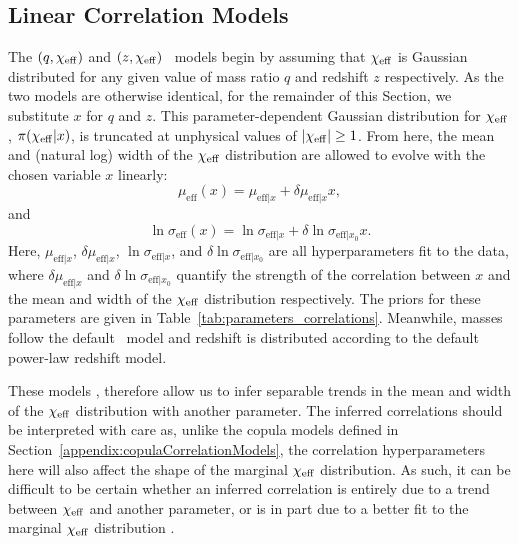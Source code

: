 \subsection{Linear Correlation Models}\label{appendix:LinearCorrelationModels}
The $(q,\chi_{\rm eff})$ and $(z,\chi_{\rm eff})$ \linearcorrelation~models begin by assuming that $\chi_{\rm eff}$ is Gaussian distributed for any given value of mass ratio $q$ and redshift $z$ respectively.
As the two models are otherwise identical, for the remainder of this Section, we substitute $x$ for $q$ and $z$.
This parameter-dependent Gaussian distribution for $\chi_{\rm eff}$, $\pi(\chi_{\rm eff}|x)$, is truncated at unphysical values of $|\chi_{\rm eff}| \geq 1$.
From here, the mean and (natural log) width of the $\chi_{\rm eff}$ distribution are allowed to evolve with the chosen variable $x$ linearly:
\begin{equation}
    \mu_\mathrm{eff}(x) = \mu_{\mathrm{eff}|x} + \delta \mu_{\mathrm{eff}|x} x,
\end{equation}
and
\begin{equation}
    \ln \sigma_\mathrm{eff}(x) = \ln \sigma_{\mathrm{eff}|x} + \delta \ln \sigma_{\mathrm{eff}|x_0} x.
\end{equation}
Here, $\mu_{\mathrm{eff}|x}$, $\delta \mu_{\mathrm{eff}|x}$, $\ln \sigma_{\mathrm{eff}|x}$, and $\delta \ln \sigma_{\mathrm{eff}|x_0}$ are all hyperparameters fit to the data, where $\delta \mu_{\mathrm{eff}|x}$ and $\delta \ln \sigma_{\mathrm{eff}|x_0}$ quantify the strength of the correlation between $x$ and the mean and width of the $\chi_{\rm eff}$ distribution respectively.
The priors for these parameters are given in Table~\ref{tab:parameters_correlations}.
Meanwhile, masses follow the default \BrokenPLTwoPeaks~model and redshift is distributed according to the default power-law redshift model.

These models \citep[in the style of those presented in][]{Safarzadeh:2020mlb, Callister:2021fpo, Biscoveanu:2022qac}, therefore allow us to infer separable trends in the mean and width of the $\chi_{\rm eff}$ distribution with another parameter.
The inferred correlations should be interpreted with care as, unlike the copula models defined in Section~\ref{appendix:copulaCorrelationModels}, the correlation hyperparameters here will also affect the shape of the marginal $\chi_{\rm eff}$ distribution.
As such, it can be difficult to be certain whether an inferred correlation is entirely due to a trend between $\chi_{\rm eff}$ and another parameter, or is in part due to a better fit to the marginal $\chi_{\rm eff}$ distribution \citep{Adamcewicz:2022hce}.


